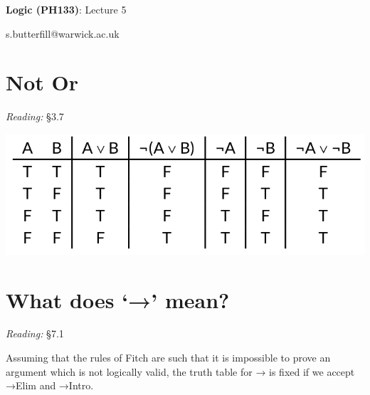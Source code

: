 \documentclass[12pt]{extarticle}
\date{}
\makeatletter
\def \ititle {Origins of Mind}
\def \isubtitle {Lecture 08}
\def \iemail{s.butterfill@warwick.ac.uk}
\makeatother
\begin{document}

\begin{multicols*}{3}

\setlength\footnotesep{1em}







\def \ititle {Logic (PH133)}
 
\def \isubtitle {Lecture 5}
 
\begin{center}
 
{\Large
 
\textbf{\ititle}: \isubtitle
 
}
 
 
 
\iemail %
 
\end{center}
 
 
 
 
\section{Not Or}
 
\emph{Reading:} §3.7
 
\begin{center}
\includegraphics[scale=0.3]{img/tt_unit_603.png}
\end{center}
 
 
\section{What does ‘→’ mean?}
 
\emph{Reading:} §7.1
 
Assuming that the rules of Fitch are such that it is impossible to prove an argument which is not logically valid, the truth table for → is fixed if we accept →Elim and →Intro.
 

\end{multicols*}
\end{document}
